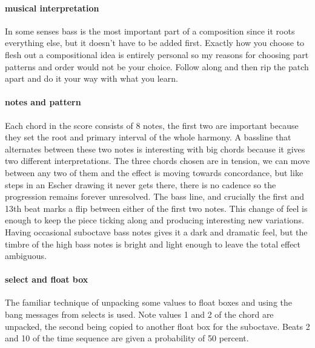\paragraph{musical interpretation}
In some senses bass is the most important part
of a composition since it roots everything else, but
it doesn't have to be added first. Exactly how you choose
to flesh out a compositional idea is entirely personal
so my reasons for choosing part patterns and order would
not be your choice. Follow along and then rip the patch apart
and do it your way with what you learn.

\paragraph{notes and pattern}
Each chord in the score consists of 8 notes, the first two are
important because they set the root and primary interval of
the whole harmony. A bassline that alternates between these
two notes is interesting with big chords because it gives
two different interpretations. The three chords chosen are 
in tension, we can move between any two of them and the effect
is moving towards concordance, but like steps in an Escher
drawing it never gets there, there is
no cadence so the progression remains forever unresolved.
The bass line, and crucially the first and 13th beat
marks a flip between either of the first two notes. This change
of feel is enough to keep the piece ticking along and producing
interesting new variations. Having occasional suboctave
bass notes gives it a dark and dramatic feel, but the timbre
of the high bass notes is bright and light enough to leave 
the total effect ambiguous.

\paragraph{select and float box}
The familiar technique of unpacking some values to float boxes
and using the bang messages from selects is used. Note values 1
and 2 of the chord are unpacked, the second being copied to
another float box for the suboctave. Beats 2 and 10 of the time
sequence are given a probability of 50 percent. 
